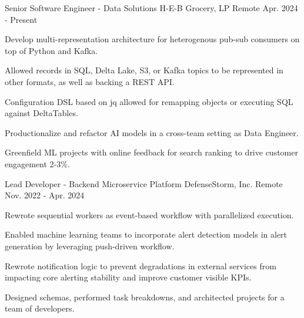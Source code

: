 
\begin{cventries}

    \cventry
    {Senior Software Engineer - Data Solutions}
    {H-E-B Grocery, LP}
    {Remote}
    {Apr. 2024 - Present}
    {
        \begin{cvitems}
            \item {Develop multi-representation architecture for heterogenous pub-sub consumers on top of Python and Kafka.}
            \item {Allowed records in SQL, Delta Lake, S3, or Kafka topics to be represented in other formats, as well as backing a REST API.}
            \item {Configuration DSL based on jq allowed for remapping objects or executing SQL against DeltaTables.}
            \item {Productionalize and refactor AI models in a cross-team setting as Data Engineer.}
            \item {Greenfield ML projects with online feedback for search ranking to drive customer engagement 2-3\%.}
        \end{cvitems}
    }

    \cventry
    {Lead Developer - Backend Microservice Platform}
    {DefenseStorm, Inc.}
    {Remote}
    {Nov. 2022 - Apr. 2024}
    {
        \begin{cvitems}
            \item {Rewrote sequential workers as event-based workflow with parallelized execution.}
            \item {Enabled machine learning teams to incorporate alert detection models in alert generation by leveraging push-driven workflow.}
            \item {Rewrote notification logic to prevent degradations in external services from impacting core alerting stability and improve customer visible KPIs.}
            \item {Designed schemas, performed task breakdowns, and architected projects for a team of developers.}
        \end{cvitems}
    }


\end{cventries}
